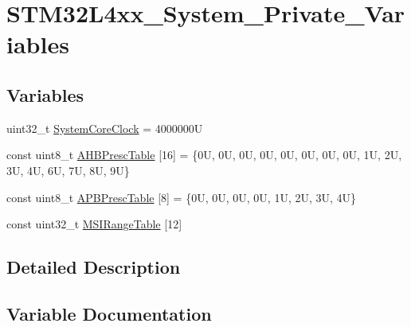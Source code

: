\hypertarget{group___s_t_m32_l4xx___system___private___variables}{}\section{S\+T\+M32\+L4xx\+\_\+\+System\+\_\+\+Private\+\_\+\+Variables}
\label{group___s_t_m32_l4xx___system___private___variables}
\subsection*{Variables}
\begin{DoxyCompactItemize}
\item 
uint32\+\_\+t \hyperlink{group___s_t_m32_l4xx___system___private___variables_gaa3cd3e43291e81e795d642b79b6088e6}{System\+Core\+Clock} = 4000000U
\item 
const uint8\+\_\+t \hyperlink{group___s_t_m32_l4xx___system___private___variables_ga6e1d9cd666f0eacbfde31e9932a93466}{A\+H\+B\+Presc\+Table} \mbox{[}16\mbox{]} = \{0\+U, 0\+U, 0\+U, 0\+U, 0\+U, 0\+U, 0\+U, 0\+U, 1\+U, 2\+U, 3\+U, 4\+U, 6\+U, 7\+U, 8\+U, 9\+U\}
\item 
const uint8\+\_\+t \hyperlink{group___s_t_m32_l4xx___system___private___variables_ga5b4f8b768465842cf854a8f993b375e9}{A\+P\+B\+Presc\+Table} \mbox{[}8\mbox{]} = \{0\+U, 0\+U, 0\+U, 0\+U, 1\+U, 2\+U, 3\+U, 4\+U\}
\item 
const uint32\+\_\+t \hyperlink{group___s_t_m32_l4xx___system___private___variables_ga4d9e663c3c5bd4ca3361bf97d48158bf}{M\+S\+I\+Range\+Table} \mbox{[}12\mbox{]}
\end{DoxyCompactItemize}


\subsection{Detailed Description}


\subsection{Variable Documentation}
\mbox{\label{group___s_t_m32_l4xx___system___private___variables_ga6e1d9cd666f0eacbfde31e9932a93466}} 
